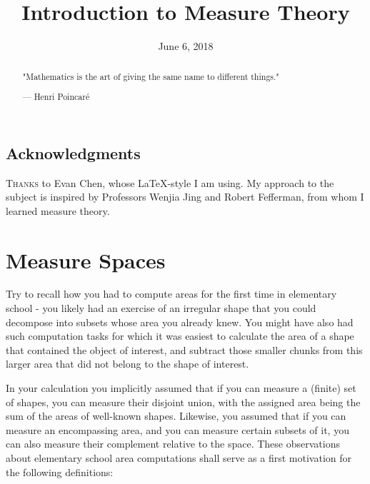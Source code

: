 \documentclass[11pt]{scrartcl}
\begin{document}
\title{Introduction to Measure Theory} %
\date{June 6, 2018}
\maketitle

\begin{abstract}
	\sffamily\small
	"Mathematics is the art of giving the same name to different things."

	\medskip

	--- Henri Poincar\'e
\end{abstract}

\vspace{1em}



\subsection*{Acknowledgments}
\textsc{Thanks} to Evan Chen, whose \LaTeX  -style I am using. My approach to the subject is inspired by Professors Wenjia Jing and Robert Fefferman, from whom I learned measure theory.

\section{Measure Spaces}

Try to recall how you had to compute areas for the first time in elementary school - you likely had an exercise of an irregular shape that you could decompose into subsets whose area you already knew. You might have also had such  computation tasks for which it was easiest to calculate the area of a shape that contained the object of interest, and subtract those smaller chunks from this larger area that did not belong to the shape of interest. 

In your calculation you implicitly assumed that if you can measure a (finite) set of shapes, you can measure their disjoint union, with the assigned area being the sum of the areas of well-known shapes. Likewise, you assumed that if you can measure an encompassing area, and you can measure certain subsets of it, you can also measure their complement relative to the space. These observations about elementary school area computations shall serve as a first motivation for the following definitions: 
\end{document}
